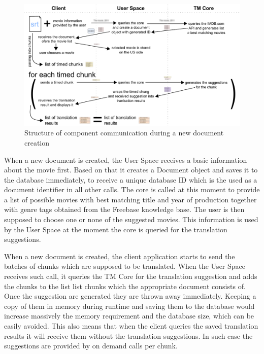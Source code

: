 \begin{figure}
\begin{center}
\includegraphics{figures/creating_document.pdf}
\end{center}
\caption{Structure of component communication during a new document creation}
\end{figure}

When a new document is created, the User Space receives a basic information about the movie first. Based on that it creates a Document object and saves it to the database immediately, to receive a unique  database ID which is the used as a document identifier in all other calls. The core is called at this moment to provide a list of possible movies with best matching title and year of production together with genre tags obtained from the Freebase knowledge base. The user is then supposed to choose one or none of the suggested movies. This information is used by the User Space at the moment the core is queried for the translation suggestions.

When a new document is created, the client application starts to send the batches of chunks which are supposed to be translated. When the User Space receives such call, it queries the TM Core for the translation suggestion and adds the chunks to the list list chunks which the appropriate document consists of. Once the suggestion are generated they are thrown away immediately. Keeping a copy of them in memory during runtime and saving them to the database would increase massively the memory requirement and the database size, which can be easily avoided. This also means that when the client queries the saved translation results it will receive them without the translation suggestions. In such case the suggestions are provided by on demand calls per chunk. 

